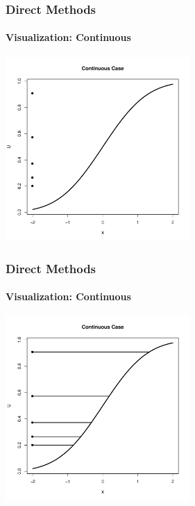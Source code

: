 \documentclass[10pt]{beamer}
\begin{document}
              \begin{frame}
                \frametitle{Direct Methods}
                \framesubtitle{Visualization: Continuous}
                \begin{center}
                  \includegraphics[height=7cm]{./Pics/cp1.pdf}
                \end{center}
              \end{frame}

              \begin{frame}
                \frametitle{Direct Methods}
                \framesubtitle{Visualization: Continuous}
                \begin{center}
                  \includegraphics[height=7cm]{./Pics/cp2.pdf}
                \end{center}
              \end{frame}
\end{document}
